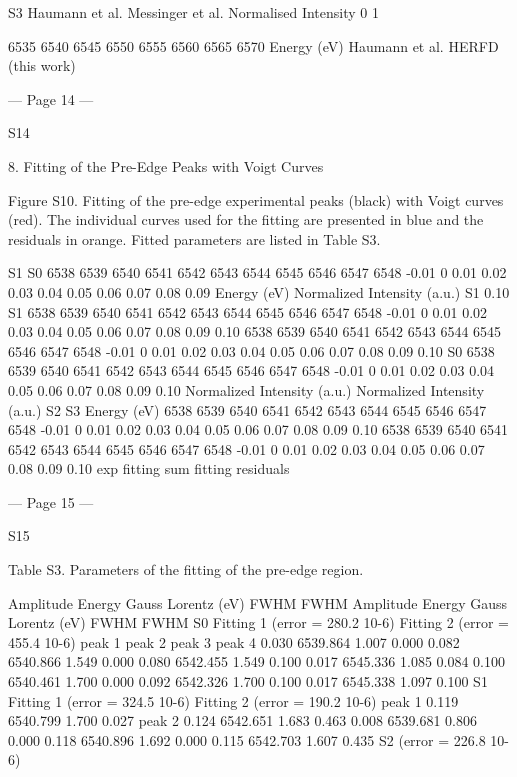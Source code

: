 S3
Haumann et al.
Messinger et al.
 Normalised Intensity
0
1
 
 
6535 6540 6545 6550 6555 6560 6565 6570
 Energy (eV)
Haumann et al.
HERFD (this work)


--- Page 14 ---
 
S14 
 
8. Fitting of the Pre-Edge Peaks with Voigt Curves 
 
Figure S10. Fitting of the pre-edge experimental peaks (black) with Voigt curves (red). The individual curves 
used for the fitting are presented in blue and the residuals in orange. Fitted parameters are listed in Table S3. 
 
 
S1
S0
6538 6539 6540 6541 6542 6543 6544 6545 6546 6547 6548
-0.01
0
0.01
0.02
0.03
0.04
0.05
0.06
0.07
0.08
0.09
Energy (eV)
Normalized Intensity (a.u.)
S1
0.10
S1
6538 6539 6540 6541 6542 6543 6544 6545 6546 6547 6548
-0.01
0
0.01
0.02
0.03
0.04
0.05
0.06
0.07
0.08
0.09
0.10
6538 6539 6540 6541 6542 6543 6544 6545 6546 6547 6548
-0.01
0
0.01
0.02
0.03
0.04
0.05
0.06
0.07
0.08
0.09
0.10
S0
6538 6539 6540 6541 6542 6543 6544 6545 6546 6547 6548
-0.01
0
0.01
0.02
0.03
0.04
0.05
0.06
0.07
0.08
0.09
0.10
Normalized Intensity (a.u.)
Normalized Intensity (a.u.)
S2
S3
Energy (eV)
6538 6539 6540 6541 6542 6543 6544 6545 6546 6547 6548
-0.01
0
0.01
0.02
0.03
0.04
0.05
0.06
0.07
0.08
0.09
0.10
6538 6539 6540 6541 6542 6543 6544 6545 6546 6547 6548
-0.01
0
0.01
0.02
0.03
0.04
0.05
0.06
0.07
0.08
0.09
0.10
exp
ﬁtting sum
ﬁtting
residuals


--- Page 15 ---
 
S15 
 
 
Table S3. Parameters of the fitting of the pre-edge region. 
 
Amplitude      Energy        Gauss        Lorentz 
                         (eV)          FWHM      FWHM 
Amplitude      Energy        Gauss        Lorentz 
                         (eV)          FWHM      FWHM 
S0 
Fitting 1 (error = 280.2 10-6) 
Fitting 2 (error = 455.4 10-6) 
peak 1 
peak 2 
peak 3 
peak 4 
0.030          6539.864       1.007          0.000 
0.082          6540.866       1.549          0.000 
0.080          6542.455       1.549          0.100 
0.017          6545.336       1.085          0.084 
   0.100         6540.461       1.700          0.000 
   0.092         6542.326       1.700          0.100 
   0.017         6545.338       1.097          0.100 
S1 
Fitting 1 (error = 324.5 10-6) 
Fitting 2 (error = 190.2 10-6) 
peak 1           0.119          6540.799       1.700          0.027 
peak 2           0.124          6542.651       1.683          0.463 
   0.008     6539.681       0.806          0.000 
   0.118     6540.896       1.692          0.000 
   0.115     6542.703       1.607          0.435 
S2 (error = 226.8 10-6) 
 

